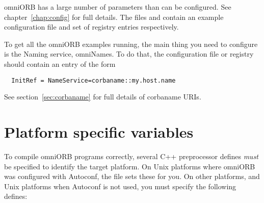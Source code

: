 \documentclass[11pt,oneside,a4paper]{book}
\begin{document}
omniORB has a large number of parameters than can be configured. See
chapter~\ref{chap:config} for full details. The files
 and  contain an example
configuration file and set of registry entries respectively.

To get all the omniORB examples running, the main thing you need to
configure is the Naming service, omniNames. To do that, the
configuration file or registry should contain an entry of the form

\begin{verbatim}
  InitRef = NameService=corbaname::my.host.name
\end{verbatim}

\noindent See section~\ref{sec:corbaname} for full details of
corbaname URIs.


\section{Platform specific variables}

To compile omniORB programs correctly, several C++ preprocessor
defines \emph{must} be specified to identify the target platform. On
Unix platforms where omniORB was configured with Autoconf, the
 file sets these for you. On other platforms, and
Unix platforms when Autoconf is not used, you must specify the
following defines:
\end{document}
